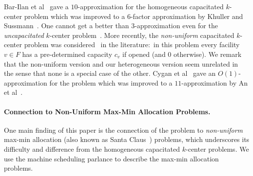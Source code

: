 Bar-Ilan et al~\cite{Bar-IlanKP93} gave a $10$-approximation for the homogeneous capacitated $k$-center problem which was improved to a $6$-factor approximation by Khuller and Sussmann~\cite{KhullerS00}. One cannot get a better than $3$-approximation even for the {\em uncapacitated} $k$-center problem~\cite{HochbaumS85}. More recently, the {\em non-uniform} capacitated $k$-center problem was considered~\cite{CyganHK12,AnBCGMS14} in the literature:~in this problem every facility $v\in F$ has a pre-determined capacity $c_v$ if opened (and $0$ otherwise). We remark that the non-uniform version and our heterogeneous version seem unrelated in the sense that none is a special case of the other.
Cygan et al~\cite{CyganHK12} gave an $O(1)$-approximation for the problem which was improved to a $11$-approximation by An et al~\cite{AnBCGMS14}.




%
%
%
\paragraph{Connection to Non-Uniform Max-Min Allocation Problems.}
One main finding of this paper is the connection of the \mckc problem to {\em non-uniform} max-min allocation (also known as Santa Claus~\cite{BansalS06}) problems, which
 underscores its difficulty and difference from  the homogeneous capacitated $k$-center problems. %
We use the machine scheduling parlance to describe the max-min allocation problems.

